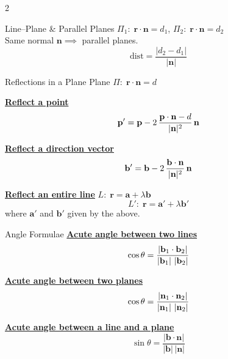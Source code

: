 \documentclass{article}
\newcommand{\modulus}[1]{\left\lvert #1 \right\rvert}
\newcommand{\length}[1]{\left\lvert #1 \right\rvert}
\begin{document}
\begin{multicols}{2}
\begin{plumbox}{Line--Plane \& Parallel Planes}
$\Pi_1\!:\;\mathbf r\cdot\mathbf n=d_1$,\quad
$\Pi_2\!:\;\mathbf r\cdot\mathbf n=d_2$ \\
Same normal $\mathbf{n} \implies$ parallel planes.\\[4pt]
\[
  \mathrm{dist}
  =\frac{\modulus{d_2-d_1}}{\length{\mathbf n}}
\]
\end{plumbox}

\begin{mintbox}{Reflections in a Plane}
Plane $\Pi\!:\;\mathbf r\cdot\mathbf n=d$

\medskip
\underline{\textbf{Reflect a point}}
\[
  \mathbf p'
  =\mathbf p
   -2\,\frac{\mathbf p\cdot\mathbf n-d}
            {|\mathbf{n}|^2}\,\mathbf n \\
\]

\underline{\textbf{Reflect a direction vector}}
\[
  \mathbf b'
  =\mathbf b
   -2\,\frac{\mathbf b\cdot\mathbf n}
            {|\mathbf{n}|^2}\,\mathbf n\\[10pt]
\]

\underline{\textbf{Reflect an entire line}}\;
$L\!:\;\mathbf r=\mathbf a+\lambda\mathbf b$
\[
 L'\!:\;\mathbf r=\mathbf a'+\lambda\mathbf b'
\]
where $\mathbf{a}'$ and $\mathbf{b}'$ given by the above.
\end{mintbox}

\begin{coralbox}{Angle Formulae}
\underline{\textbf{Acute angle between two lines}}
\[
  \cos\theta
  =\frac{\modulus{\mathbf b_1\cdot\mathbf b_2}}
        {\length{\mathbf b_1}\,\length{\mathbf b_2}} \\[10pt]
\]

\underline{\textbf{Acute angle between two planes}}
\[
  \cos\theta
  =\frac{\modulus{\mathbf n_1\cdot\mathbf n_2}}
        {\length{\mathbf n_1}\,\length{\mathbf n_2}} \\[10pt]
\]

\underline{\textbf{Acute angle between a line and a plane}}
\[
  \sin\theta
  =\frac{\modulus{\mathbf b\cdot\mathbf n}}
        {\length{\mathbf b}\,\length{\mathbf n}}
\]
\end{coralbox}

\end{multicols}
\end{document}
